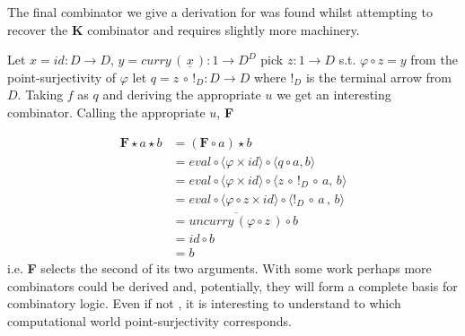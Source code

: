The final combinator we give a derivation for was found whilst attempting to
recover the \textbf{K} combinator and requires slightly more machinery.

Let $x = id : D \rightarrow D$, $y = curry \, ( \, \underline{x} \, ) : 1
\rightarrow D^D$ pick $z : 1 \rightarrow D$ s.t. $\varphi \circ z = y$ from the
point-surjectivity of $\varphi$ let $q = z \, \circ \, !_{D} : D \rightarrow D$
where $!_{D}$ is the terminal arrow from $D$. Taking $f$ as $q$ and deriving the
appropriate $u$ we get an interesting combinator. Calling the appropriate
$u$, \textbf{F}

\begin{align*}
    \textbf{F} \star a \star b &= (\textbf{F} \circ a) \star b \\
    &= eval \circ \langle \varphi  \times id \rangle \circ \langle q \circ a , b
    \rangle \\
    &= eval \circ \langle \varphi \times id \rangle \circ \langle z \, \circ \, !_{D}
    \, \circ \, a , \, b \rangle \\
    &= eval \circ \langle \varphi \circ z \times id \rangle \circ \langle !_{D} \,
    \circ \, a \, , \, b \rangle \\
    &= \overline{uncurry \, ( \varphi \circ z \, )} \circ b \\
    &= id \circ b \\
    &= b
\end{align*}
i.e. \textbf{F} selects the second of its two arguments. With some work perhaps
more combinators could be derived and, potentially, they will form a complete
basis for combinatory logic. Even if not , it is interesting to understand to
which computational world point-surjectivity corresponds.
